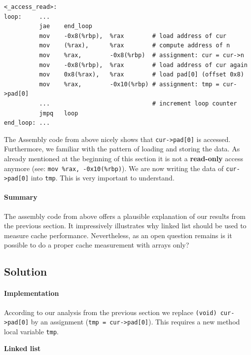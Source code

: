\begin{verbatim}
<_access_read>:
loop:     ...
          jae    end_loop
          mov    -0x8(%rbp),  %rax        # load address of cur
          mov    (%rax),      %rax        # compute address of n
          mov    %rax,        -0x8(%rbp)  # assignment: cur = cur->n
          mov    -0x8(%rbp),  %rax        # load address of cur again
          mov    0x8(%rax),   %rax        # load pad[0] (offset 0x8)
          mov    %rax,        -0x10(%rbp) # assignment: tmp = cur->pad[0]
          ...                             # increment loop counter
          jmpq   loop
end_loop: ...
\end{verbatim}

The Assembly code from above nicely shows that
\texttt{cur-\textgreater{}pad{[}0{]}} is accessed. Furthermore, we
familiar with the pattern of loading and storing the data. As already
mentioned at the beginning of this section it is not a
\textbf{read-only} access anymore (see:
\texttt{mov\ \%rax,\ -0x10(\%rbp)}). We are now writing the data of
\texttt{cur-\textgreater{}pad{[}0{]}} into \texttt{tmp}. This is very
important to understand.

\paragraph{Summary}\label{summary-2}

The assembly code from above offers a plausible explanation of our
results from the previous section. It impressively illustrates why
linked list should be used to measure cache performance. Nevertheless,
as an open question remains is it possible to do a proper cache
measurement with arrays only?

\hypertarget{solution}{\subsection{Solution}\label{solution}}

\paragraph{Implementation}\label{implementation-4}

According to our analysis from the previous section we replace
\texttt{(void)\ cur-\textgreater{}pad{[}0{]}} by an assignment
(\texttt{tmp\ =\ cur-\textgreater{}pad{[}0{]}}). This requires a new
method local variable \texttt{tmp}.

\textbf{Linked list}

